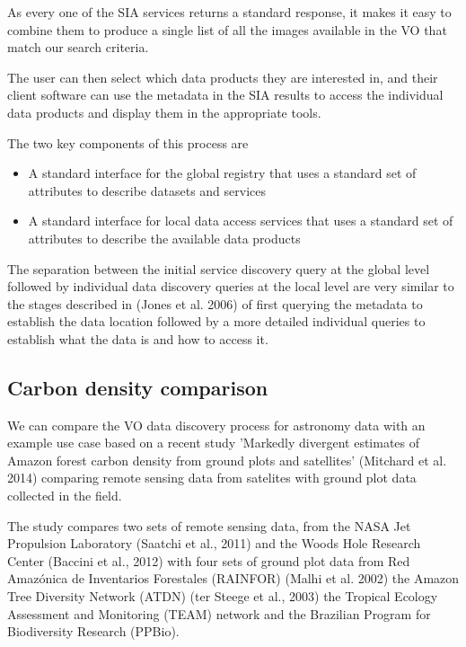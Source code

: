 \documentclass{article}
\begin{document}
As every one of the SIA services returns a standard response, it makes it easy
to combine them to produce a single list of all the images available in the VO
that match our search criteria.

The user can then select which data products they are interested in, and their
client software can use the metadata in the SIA results to access the individual
data products and display them in the appropriate tools.

\noindent
The two key components of this process are
\begin{itemize}
  \item A standard interface for the global registry that uses a standard set of
  attributes to describe datasets and services
  \item A standard interface for local data access services that uses a standard
  set of attributes to describe the available data products
\end{itemize}

The separation between the initial service discovery query at the global
level followed by individual data discovery queries at the local level
are very similar to the stages described in (Jones et al. 2006) of first
querying the metadata to establish the data location followed by a more detailed
individual queries to establish what the data is and how to access it.

\subsection{Carbon density comparison}

We can compare the VO data discovery process for astronomy data with an example
use case based on a recent study 'Markedly divergent estimates of Amazon forest
carbon density from ground plots and satellites' (Mitchard et al. 2014)
comparing remote sensing data from satelites with ground plot data collected in
the field.

The study compares two sets of remote sensing data, from
the NASA Jet Propulsion Laboratory
(Saatchi et al., 2011)
and the Woods Hole Research Center
(Baccini et al., 2012)
with four sets of ground plot data from
Red Amazónica de Inventarios Forestales (RAINFOR) (Malhi et al. 2002)
the Amazon Tree Diversity Network (ATDN) (ter Steege et al., 2003)
the Tropical Ecology Assessment and Monitoring (TEAM)
network and the
Brazilian Program for Biodiversity Research
(PPBio).
\end{document}
